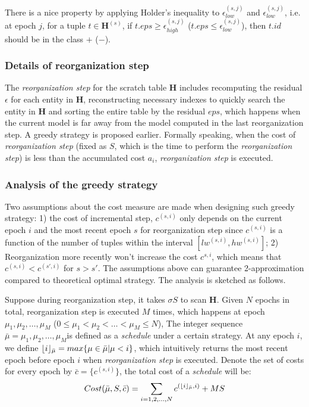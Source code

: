 There is a nice property by applying Holder's inequality \cite{rudin1976principles} to $\epsilon_{low}^{(s,j)}$ and $\epsilon_{low}^{(s,j)}$, i.e. at epoch $j$, for a tuple $t \in \textbf{H}^{(s)}$, if $t.eps \geq \epsilon_{high}^{(s,j)}$ ($t.eps \leq \epsilon_{low}^{(s,j)}$), then $t.id$ should be in the class $+$ ($-$).

\subsubsection{Details of reorganization step}
The {\em reorganization step} for the scratch table $\textbf{H}$ includes recomputing the residual $\epsilon$ for each entity in $\textbf{H}$, reconstructing necessary indexes to quickly search the entity in $\textbf{H}$ and sorting the entire table by the residual $eps$, which happens when the current model is far away from the model computed in the last reorganization step. A greedy strategy is proposed earlier.  Formally speaking, when the cost of {\em reorganization step} (fixed as $S$, which is the time to perform the {\em reorganization step}) is less than the accumulated cost $a_{i}$, {\em reorganization step} is executed.

\subsubsection{Analysis of the greedy strategy}
Two assumptions about the cost measure are made when designing such greedy strategy: 1) the cost of incremental step, $c^{(s, i)}$ only depends on the current epoch $i$ and the most recent epoch $s$ for reorganization step since $c^{(s, i)}$ is a function of the number of tuples within the interval $[lw^{(s,i)}, hw^{(s,i)}]$; 2) Reorganization more recently won't increase the cost $c^{s,i}$, which means that $c^{(s, i)} < c^{(s',i)}$ for $s > s'$. The assumptions above can guarantee 2-approximation compared to theoretical optimal strategy. The analysis is sketched as follows.

Suppose during reorganization step, it takes $\sigma S$ to scan $\textbf{H}$. Given $N$ epochs in total, reorganization step is executed $M$ times, which happens at epoch $\mu_1, \mu_2,\dots, \mu_M$ ($0 \leq \mu_1 < \mu_2 < \dots < \mu_M \leq N$), The integer sequence $\bar{\mu} = \mu_1, \mu_2,\dots, \mu_M$is defined as a {\em schedule} under a certain strategy. At any epoch $i$, we define $\lfloor i\rfloor_{\bar{\mu}} = max\{\mu \in \bar{\mu} | \mu < i\}$, which intuitively returns the most recent epoch before epoch $i$ when {\em reorganization step} is executed. Denote the set of costs for every epoch by $\bar{c} = \{c^{(s,i)}\}$, the total cost of a {\em schedule} will be:
\begin{equation}\label{eq: cost}
    Cost(\bar{\mu}, S, \bar{c}) = \sum_{i=1,2,\dots,N}c^{(\lfloor i\rfloor_{\bar{\mu}}, i)} + MS
\end{equation}

